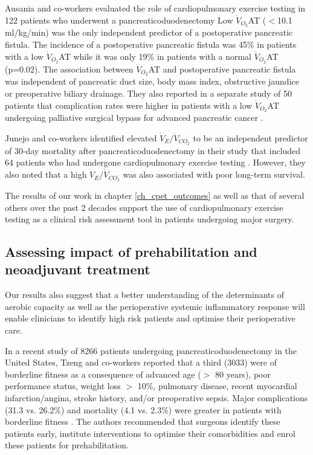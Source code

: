Ausania and co-workers evaluated the role of cardiopulmonary exercise testing in 122 patients who underwent a pancreaticoduodenectomy \parencite{ausania_effects_2012}
Low $\dot{V}_{O_2}$AT ($<$10.1 ml/kg/min) was the only independent predictor of a postoperative pancreatic fistula.
The incidence of a postoperative pancreatic fistula was 45\% in patients with a low $\dot{V}_{O_2}$AT while it was only 19\% in patients with a normal $\dot{V}_{O_2}$AT (p=0.02).
The association between $\dot{V}_{O_2}$AT and postoperative pancreatic fistula was independent of pancreatic duct size, body mass index, obstructive jaundice or preoperative biliary drainage.
They also reported in a separate study of 50 patients that complication  rates were higher in patients with a low $\dot{V}_{O_2}$AT undergoing palliative surgical bypass for advanced pancreatic cancer \parencite{ausania_double_2012}.

Junejo and co-workers identified elevated $\dot{V}_E/\dot{V}_{CO_2}$ to be an independent predictor of 30-day mortality after pancreaticoduodenectomy in their study that included 64 patients who had undergone cardiopulmonary exercise testing \parencite{junejo_cardiopulmonary_2014}.
However, they also noted that a high $\dot{V}_E/\dot{V}_{CO_2}$ was also associated with poor long-term survival.

The results of our work in chapter \ref{ch_cpet_outcomes} as well as that of several others over the past 2 decades support the use of cardiopulmonary exercise testing as a clinical risk assessment tool in patients undergoing major surgery.

\subsection{Assessing impact of prehabilitation and neoadjuvant treatment}

Our results also suggest that a better understanding of the determinants of aerobic capacity as well as the perioperative systemic inflammatory response will enable clinicians to identify high risk patients and optimise their perioperative care.

In a recent study of 8266 patients undergoing pancreaticoduodenectomy in the United States, Tzeng and co-workers reported that a third (3033) were of borderline fitness as a consequence of advanced age ($>$ 80 years), poor performance status, weight loss $>$ 10\%, pulmonary disease, recent myocardial infarction/angina, stroke history, and/or preoperative sepsis. 
Major complications (31.3 vs. 26.2\%) and mortality (4.1 vs. 2.3\%) were greater in patients with borderline fitness \parencite{tzeng_morbidity_2014}.
The authors recommended that surgeons identify these patients early, institute interventions to optimise their comorbidities and enrol these patients for prehabilitation. 

